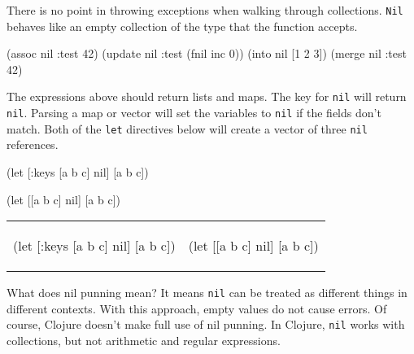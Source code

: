 There is no point in throwing exceptions when walking through collections. \verb|Nil| behaves like an empty collection of the type that the function accepts.

\begin{english}
  \begin{clojure}
(assoc nil :test 42)
(update nil :test (fnil inc 0))
(into nil [1 2 3])
(merge nil {:test 42})
  \end{clojure}
\end{english}

\noindent
The expressions above should return lists and maps. The key for \verb|nil| will return \verb|nil|. Parsing a map or vector will set the variables to \verb|nil| if the fields don't match. Both of the \verb|let| directives below will create a vector of three \verb|nil| references.

\ifx\DEVICETYPE\MOBILE

\begin{english}
  \begin{clojure}
(let [{:keys [a b c]} nil]
  [a b c])
  \end{clojure}

\splitter

  \begin{clojure}
(let [[a b c] nil]
  [a b c])
  \end{clojure}
\end{english}

\else

\begin{english}
\noindent
\begin{tabular}{ @{}p{5cm} @{}p{5cm} }

  \begin{clojure}
(let [{:keys [a b c]} nil]
  [a b c])
  \end{clojure}

&

  \begin{clojure}
(let [[a b c] nil]
  [a b c])
  \end{clojure}

\end{tabular}

\end{english}

\fi


What does nil punning mean? It means \verb|nil| can be treated as different things in different contexts. With this approach, empty values do not cause errors. Of course, Clojure doesn't make full use of nil punning. In Clojure, \verb|nil| works with collections, but not arithmetic and regular expressions.


